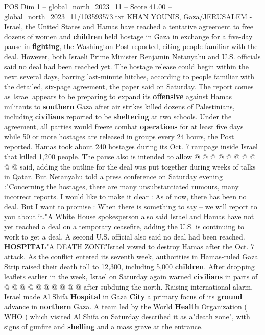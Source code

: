 \begin{textsample}{POS Dim 1 – global\_north\_2023\_11 – Score 41.00 – global\_north\_2023\_11/103593573.txt}  \label{ex:f1_pos_254}
KHAN YOUNIS, Gaza/JERUSALEM - Israel, the United States and Hamas have reached a tentative agreement to free dozens of women and \textbf{children} held hostage in Gaza in exchange for a five-day pause in \textbf{fighting}, the Washington Post reported, citing people familiar with the deal.
However, both Israeli Prime Minister Benjamin Netanyahu and U.S. officials said no deal had been reached yet.
The hostage release could begin within the next several days, barring last-minute hitches, according to people familiar with the detailed, six-page agreement, the paper said on Saturday.
The report comes as Israel appears to be preparing to expand its \textbf{offensive} against Hamas militants to \textbf{southern} Gaza after air strikes killed dozens of Palestinians, including \textbf{civilians} reported to be \textbf{sheltering} at two schools.
Under the agreement, all parties would freeze combat \textbf{operations} for at least five days while 50 or more hostages are released in groups every 24 hours, the Post reported.
Hamas took about 240 hostages during its Oct. 7 rampage inside Israel that killed 1,200 people.
The pause also is intended to allow @ @ @ @ @ @ @ @ @ @ said, adding the outline for the deal was put together during weeks of talks in Qatar.
But Netanyahu told a press conference on Saturday evening :"Concerning the hostages, there are many unsubstantiated rumours, many incorrect reports.
I would like to make it clear : As of now, there has been no deal.
But I want to promise : When there is something to say -- we will report to you about it."A White House spokesperson also said Israel and Hamas have not yet reached a deal on a temporary ceasefire, adding the U.S. is continuing to work to get a deal.
A second U.S. official also said no deal had been reached. \textbf{HOSPITAL}"A DEATH ZONE"Israel vowed to destroy Hamas after the Oct. 7 attack.
As the conflict entered its seventh week, authorities in Hamas-ruled Gaza Strip raised their death toll to 12,300, including 5,000 \textbf{children}.
After dropping leaflets earlier in the week, Israel on Saturday again warned \textbf{civilians} in parts of @ @ @ @ @ @ @ @ @ @ after subduing the north.
Raising international alarm, Israel made Al Shifa \textbf{Hospital} in Gaza \textbf{City} a primary focus of its \textbf{ground} advance in \textbf{northern} Gaza.
A team led by the World \textbf{Health} Organization ( WHO ) which visited Al Shifa on Saturday described it as a"death zone", with signs of gunfire and \textbf{shelling} and a mass grave at the entrance.

\end{textsample}
